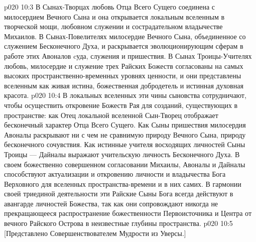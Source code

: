 \vs p020 10:3 В Сынах\hyp{}Творцах любовь Отца Всего Сущего соединена с милосердием Вечного Сына и она открывается локальным вселенным в творческой мощи, любовном служении и сострадательном владычестве Михаилов. В Сынах\hyp{}Повелителях милосердие Вечного Сына, объединенное со служением Бесконечного Духа, и раскрывается эволюционирующим сферам в работе этих Авоналов cуда, служения и пришествия. В Сынах Троицы\hyp{}Учителях любовь, милосердие и служение трех Райских Божеств согласованы на самых высоких пространственно\hyp{}временных уровнях ценности, и они представлены вселенным как живая истина, божественная добродетель и истинная духовная красота.
\vs p020 10:4 В локальных вселенных эти чины сыновства сотрудничают, чтобы осуществить откровение Божеств Рая для созданий, существующих в пространстве: как Отец локальной вселенной Сын\hyp{}Творец отображает бесконечный характер Отца Всего Сущего. Как Сыны пришествия милосердия Авоналы раскрывают ни с чем не сравнимую природу Вечного Сына, природу бесконечного сочувствия. Как истинные учителя восходящих личностей Сыны Троицы --- Дайналы выражают учительскую личность Бесконечного Духа. В своем божественно совершенном согласовании Михаилы, Авоналы и Дайналы способствуют актуализации и откровению личности и владычества Бога Верховного для вселенных пространства\hyp{}времени и в них самих. В гармонии своей триединой деятельности эти Райские Сыны Бога всегда действуют в авангарде личностей Божества, так как они сопровождают никогда не прекращающееся распространение божественности Первоисточника и Центра от вечного Райского Острова в неизвестные глубины пространства.
\vs p020 10:5 [Представлено Совершенствователем Мудрости из Уверсы.]
